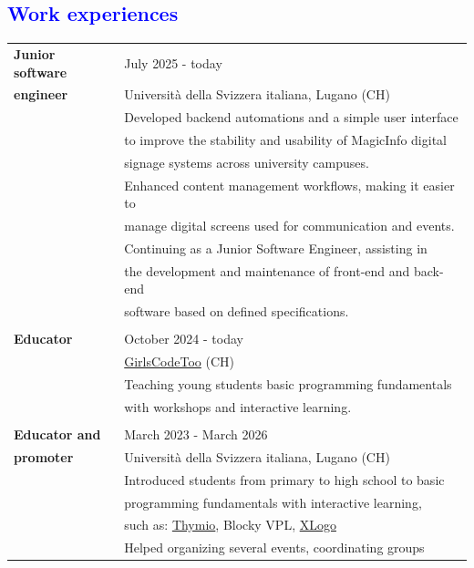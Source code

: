 \documentclass[12pt]{article}
\begin{document}
\textcolor{blue}{\section*{Work experiences}}

\begin{table}[H]
	\begin{tabular}{ll}
        \textbf{Junior software} & July 2025 - today\\
		\textbf{engineer} & Università della Svizzera italiana, Lugano (CH)\\
        &  Developed backend automations and a simple user interface\\
        & to improve the stability and usability of MagicInfo digital\\
        & signage systems across university campuses.\\
        & Enhanced content management workflows, making it easier to\\
        & manage digital screens used for communication and events.\\
        & Continuing as a Junior Software Engineer, assisting in \\
        & the development and maintenance of front-end and back-end\\
        &software based on defined specifications.\\
        \\
        \textbf{Educator} & October 2024 - today\\
		  & \href{https://girlscodetoo.ch/schools/#}{GirlsCodeToo} (CH)\\
		& Teaching young students basic programming fundamentals \\
        & with workshops and interactive learning.\\
        \\
		\textbf{Educator and} & March 2023 - March 2026\\
		\textbf{promoter}& Università della Svizzera italiana, Lugano (CH)\\
		& Introduced students from primary to high school to basic   \\
        & programming fundamentals with interactive learning,  \\
        & such as: \href{https://www.thymio.org/}{Thymio}, Blocky VPL, \href{https://xlogo.inf.ethz.ch/release/latest/#/}{XLogo}\\
		& Helped organizing several events, coordinating groups\\

\end{tabular}
\end{table}
\end{document}
